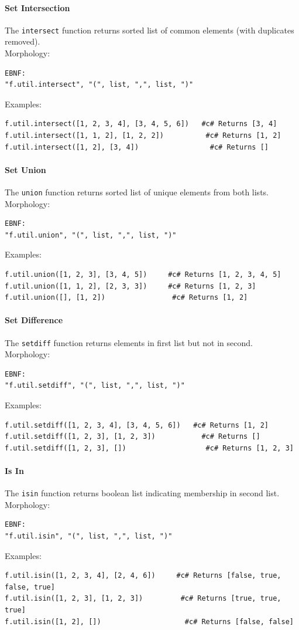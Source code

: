 \paragraph{Set Intersection}
The \texttt{intersect} function returns sorted list of common elements (with duplicates removed).\\
Morphology:
\begin{verbatim}
EBNF:
"f.util.intersect", "(", list, ",", list, ")"
\end{verbatim}
Examples:
\begin{verbatim}
f.util.intersect([1, 2, 3, 4], [3, 4, 5, 6])   #c# Returns [3, 4]
f.util.intersect([1, 1, 2], [1, 2, 2])          #c# Returns [1, 2]
f.util.intersect([1, 2], [3, 4])                 #c# Returns []
\end{verbatim}

\paragraph{Set Union}
The \texttt{union} function returns sorted list of unique elements from both lists.\\
Morphology:
\begin{verbatim}
EBNF:
"f.util.union", "(", list, ",", list, ")"
\end{verbatim}
Examples:
\begin{verbatim}
f.util.union([1, 2, 3], [3, 4, 5])     #c# Returns [1, 2, 3, 4, 5]
f.util.union([1, 1, 2], [2, 3, 3])     #c# Returns [1, 2, 3]
f.util.union([], [1, 2])                #c# Returns [1, 2]
\end{verbatim}

\paragraph{Set Difference}
The \texttt{setdiff} function returns elements in first list but not in second.\\
Morphology:
\begin{verbatim}
EBNF:
"f.util.setdiff", "(", list, ",", list, ")"
\end{verbatim}
Examples:
\begin{verbatim}
f.util.setdiff([1, 2, 3, 4], [3, 4, 5, 6])   #c# Returns [1, 2]
f.util.setdiff([1, 2, 3], [1, 2, 3])           #c# Returns []
f.util.setdiff([1, 2, 3], [])                   #c# Returns [1, 2, 3]
\end{verbatim}

\paragraph{Is In}
The \texttt{isin} function returns boolean list indicating membership in second list.\\
Morphology:
\begin{verbatim}
EBNF:
"f.util.isin", "(", list, ",", list, ")"
\end{verbatim}
Examples:
\begin{verbatim}
f.util.isin([1, 2, 3, 4], [2, 4, 6])     #c# Returns [false, true, false, true]
f.util.isin([1, 2, 3], [1, 2, 3])         #c# Returns [true, true, true]
f.util.isin([1, 2], [])                    #c# Returns [false, false]
\end{verbatim}

